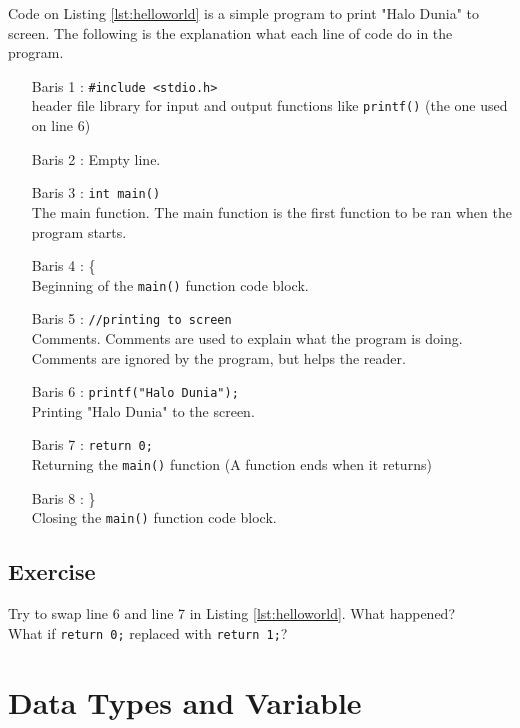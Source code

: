 Code on Listing \ref{lst:helloworld} is a simple program to print "Halo Dunia" to screen. The following is the explanation what each line of code do in the program.
\begin{itemize}\setlength\itemsep{-0.1em}
	\item [Baris 1 :] \verb|#include <stdio.h>|\\ header file library for input and output functions like \verb|printf()| (the one used on line 6)
	\item[Baris 2 :] Empty line. 
	\item [Baris 3 :] \verb|int main()|\\ The main function. The main function is the first function to be ran when the program starts.
	\item[Baris 4 :] \{ \\Beginning of the \verb|main()| function code block.
	\item[Baris 5 :]\verb|//printing to screen|\\ Comments. Comments are used to explain what the program is doing. Comments are ignored by the program, but helps the reader.
	\item[Baris 6 :]\verb|printf("Halo Dunia");|\\ Printing "Halo Dunia" to the screen.
	\item[Baris 7 :] \verb|return 0;| \\Returning the \verb|main()| function (A function ends when it returns)
	\item [Baris 8 :] \}\\Closing the \verb|main()| function code block.
\end{itemize}
\subsection{Exercise}
Try to swap line 6 and line 7 in Listing \ref{lst:helloworld}. What happened?\\
What if \verb|return 0;| replaced with \verb|return 1;|?




\section{Data Types and Variable}
